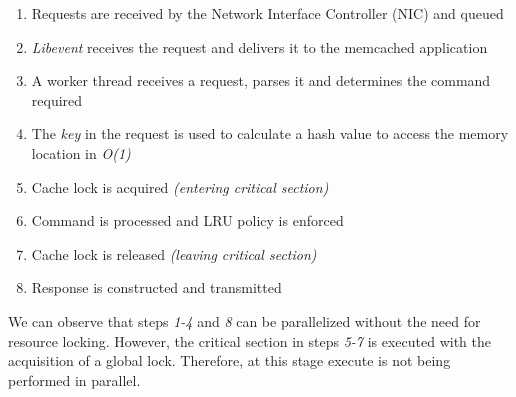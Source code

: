 \begin{enumerate}
    \item Requests are received by the Network Interface Controller (NIC) and queued
    \item \emph{Libevent} receives the request and delivers it to the memcached application
    \item A worker thread receives a request, parses it and determines the command required
    \item The \emph{key} in the request is used to calculate a hash value to access the memory location in \emph{O(1)}
    \item Cache lock is acquired \emph{(entering critical section)}
    \item Command is processed and LRU policy is enforced
    \item Cache lock is released \emph{(leaving critical section)}
    \item Response is constructed and transmitted \cite{wiggins2012enhancing}
\end{enumerate}

We can observe that steps \textit{1-4} and \textit{8} can be parallelized without the need for resource locking. However, the critical section in steps \textit{5-7} is executed with the acquisition of a global lock. Therefore, at this stage execute is not being performed in parallel.



